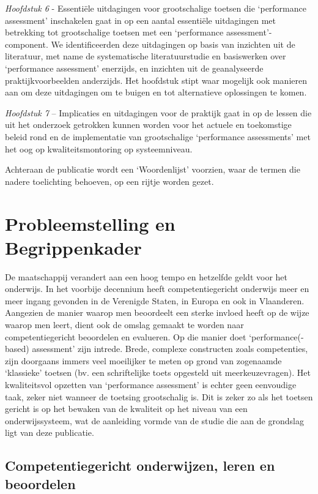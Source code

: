 \documentclass[
  letterpaper,
]{report}
\begin{document}
\emph{Hoofdstuk 6} - Essentiële uitdagingen voor grootschalige toetsen
die `performance assessment' inschakelen gaat in op een aantal
essentiële uitdagingen met betrekking tot grootschalige toetsen met een
`performance assessment'-component. We identificeerden deze uitdagingen
op basis van inzichten uit de literatuur, met name de systematische
literatuurstudie en basiswerken over `performance assessment' enerzijds,
en inzichten uit de geanalyseerde praktijkvoorbeelden anderzijds. Het
hoofdstuk stipt waar mogelijk ook manieren aan om deze uitdagingen om te
buigen en tot alternatieve oplossingen te komen.

\emph{Hoofdstuk 7} -- Implicaties en uitdagingen voor de praktijk gaat
in op de lessen die uit het onderzoek getrokken kunnen worden voor het
actuele en toekomstige beleid rond en de implementatie van grootschalige
`performance assessments' met het oog op kwaliteitsmontoring op
systeemniveau.

Achteraan de publicatie wordt een `Woordenlijst' voorzien, waar de
termen die nadere toelichting behoeven, op een rijtje worden gezet.

\hypertarget{probH2}{%
\chapter{Probleemstelling en Begrippenkader}\label{probH2}}

De maatschappij verandert aan een hoog tempo en hetzelfde geldt voor het
onderwijs. In het voorbije decennium heeft competentiegericht onderwijs
meer en meer ingang gevonden in de Verenigde Staten, in Europa en ook in
Vlaanderen. Aangezien de manier waarop men beoordeelt een sterke invloed
heeft op de wijze waarop men leert, dient ook de omslag gemaakt te
worden naar competentiegericht beoordelen en evalueren. Op die manier
doet `performance(-based) assessment' zijn intrede. Brede, complexe
constructen zoals competenties, zijn doorgaans immers veel moeilijker te
meten op grond van zogenaamde `klassieke' toetsen (bv. een schriftelijke
toets opgesteld uit meerkeuzevragen). Het kwaliteitsvol opzetten van
`performance assessment' is echter geen eenvoudige taak, zeker niet
wanneer de toetsing grootschalig is. Dit is zeker zo als het toetsen
gericht is op het bewaken van de kwaliteit op het niveau van een
onderwijssysteem, wat de aanleiding vormde van de studie die aan de
grondslag ligt van deze publicatie.

\hypertarget{competentiegericht-onderwijzen-leren-en-beoordelen}{%
\section{Competentiegericht onderwijzen, leren en
beoordelen}\label{competentiegericht-onderwijzen-leren-en-beoordelen}}
\end{document}

